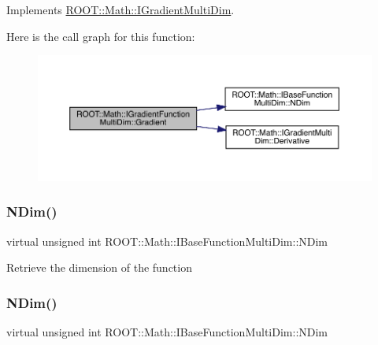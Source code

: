 Implements \mbox{\hyperlink{classROOT_1_1Math_1_1IGradientMultiDim_ac5785e2df4fa36061bf9ddbb9ce4dde0}{R\+O\+O\+T\+::\+Math\+::\+I\+Gradient\+Multi\+Dim}}.

Here is the call graph for this function\+:
\nopagebreak
\begin{figure}[H]
\begin{center}
\leavevmode
\includegraphics[width=350pt]{da/d1a/classROOT_1_1Math_1_1IGradientFunctionMultiDim_ab65a713d2637c69b334d2119ef4f0e26_cgraph}
\end{center}
\end{figure}
\mbox{\label{classROOT_1_1Math_1_1IGradientFunctionMultiDim_af046a6f630930e59fe5356a9795aec46}} 
\subsubsection{\texorpdfstring{NDim()}{NDim()}\hspace{0.1cm}{\footnotesize\ttfamily [1/9]}}
{\footnotesize\ttfamily virtual unsigned int R\+O\+O\+T\+::\+Math\+::\+I\+Base\+Function\+Multi\+Dim\+::\+N\+Dim}

Retrieve the dimension of the function \mbox{\label{classROOT_1_1Math_1_1IGradientFunctionMultiDim_af046a6f630930e59fe5356a9795aec46}} 
\subsubsection{\texorpdfstring{NDim()}{NDim()}\hspace{0.1cm}{\footnotesize\ttfamily [2/9]}}
{\footnotesize\ttfamily virtual unsigned int R\+O\+O\+T\+::\+Math\+::\+I\+Base\+Function\+Multi\+Dim\+::\+N\+Dim}


